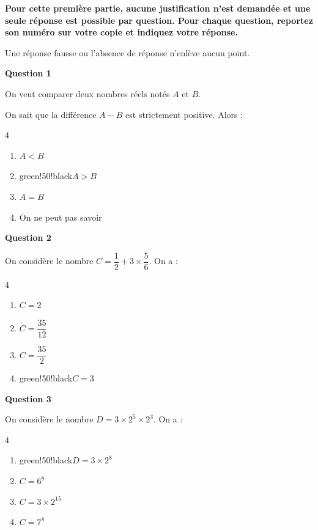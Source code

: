 \textbf{Pour cette première partie, aucune justification n'est demandée et une seule réponse est possible par question. Pour chaque question, reportez son numéro sur votre copie et indiquez votre réponse.}

	Une réponse fausse ou l'absence de réponse n'enlève aucun point.

\bigskip

	\textbf{Question 1}

On veut comparer deux nombres réels notés $A$ et $B$.

On sait que la différence $A - B$ est strictement positive. Alors :

\begin{multicols}{4}
\begin{enumerate}[label=\textbf{\alph* .}]
\item $A<B$
\item \begin{color}{green!50!black}$\boxed{A>B}$\end{color}
\item $A=B$
\item On ne peut pas savoir
\end{enumerate}
\end{multicols}

	\textbf{Question 2}

On considère le nombre $C=\dfrac{1}{2}+3\times\dfrac{5}{6}$. On a :

\begin{multicols}{4}
\begin{enumerate}[label=\textbf{\alph* .}]
\item $C = 2$
\item $C = \dfrac{35}{12}$
\item $C = \dfrac{35}{2}$
\item \begin{color}{green!50!black}$\boxed{C = 3}$\end{color}
\end{enumerate}
\end{multicols}

\textbf{Question 3}

On considère le nombre $D=3 \times 2^5 \times 2^3$. On a :

\begin{multicols}{4}
\begin{enumerate}[label=\textbf{\alph* .}]
\item \begin{color}{green!50!black}$\boxed{D = 3\times 2^8}$\end{color}
\item $C = 6^{8}$
\item $C = 3\times 2^{15}$
\item $C = 7^{8}$
\end{enumerate}
\end{multicols}


